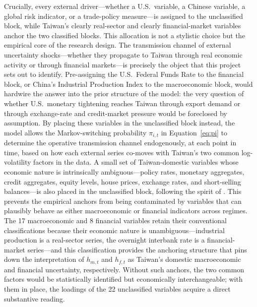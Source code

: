 Crucially, every external driver---whether a U.S.\ variable, a Chinese variable, a global risk indicator, or a trade-policy measure---is assigned to the unclassified block, while Taiwan's clearly real-sector and clearly financial-market variables anchor the two classified blocks. This allocation is not a stylistic choice but the empirical core of the research design. The transmission channel of external uncertainty shocks---whether they propagate to Taiwan through real economic activity or through financial markets---is precisely the object that this project sets out to identify. Pre-assigning the U.S.\ Federal Funds Rate to the financial block, or China's Industrial Production Index to the macroeconomic block, would hardwire the answer into the prior structure of the model: the very question of whether U.S.\ monetary tightening reaches Taiwan through export demand or through exchange-rate and credit-market pressure would be foreclosed by assumption. By placing these variables in the unclassified block instead, the model allows the Markov-switching probability $\pi_{i,t}$ in Equation~\eqref{eq:pi} to determine the operative transmission channel endogenously, at each point in time, based on how each external series co-moves with Taiwan's two common log-volatility factors in the data. A small set of Taiwan-domestic variables whose economic nature is intrinsically ambiguous---policy rates, monetary aggregates, credit aggregates, equity levels, house prices, exchange rates, and short-selling balances---is also placed in the unclassified block, following the spirit of \citet{davidson2025investigating}. This prevents the empirical anchors from being contaminated by variables that can plausibly behave as either macroeconomic or financial indicators across regimes. The 17 macroeconomic and 8 financial variables retain their conventional classifications because their economic nature is unambiguous---industrial production is a real-sector series, the overnight interbank rate is a financial-market series---and this classification provides the anchoring structure that pins down the interpretation of $h_{m,t}$ and $h_{f,t}$ as Taiwan's domestic macroeconomic and financial uncertainty, respectively. Without such anchors, the two common factors would be statistically identified but economically interchangeable; with them in place, the loadings of the 22 unclassified variables acquire a direct substantive reading.


